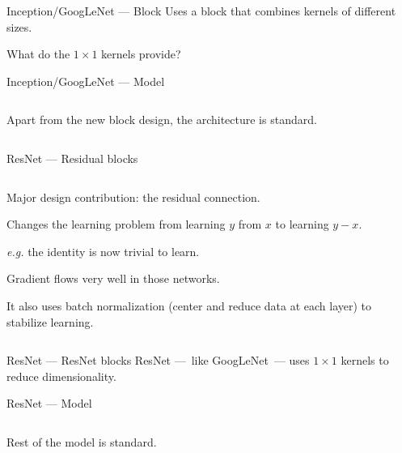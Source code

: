 \begin{frame}{Inception/GoogLeNet --- Block}
  Uses a block that combines kernels of different sizes.


  What do the $1 \times 1$ kernels provide?
\end{frame}

\begin{frame}{Inception/GoogLeNet --- Model}
  \begin{columns}
    \begin{column}{0.6\textwidth}
      Apart from the new block design, the architecture is standard.
    \end{column}
    \begin{column}{0.4\textwidth}
    \end{column}
  \end{columns}
\end{frame}

\begin{frame}{ResNet --- Residual blocks}
  \begin{columns}
    \begin{column}{0.5\textwidth}
      Major design contribution: the residual connection.

      Changes the learning problem from learning $y$ from $x$ to learning $y - x$.

      \emph{e.g.} the identity is now trivial to learn.

      Gradient flows very well in those networks.

      It also uses batch normalization (center and reduce data at each layer) to stabilize learning.
    \end{column}
    \begin{column}{0.5\textwidth}
    \end{column}
  \end{columns}
\end{frame}

\begin{frame}{ResNet --- ResNet blocks}
  ResNet ---~like GoogLeNet~--- uses $1 \times 1$ kernels to reduce dimensionality.

\end{frame}

\begin{frame}{ResNet --- Model}
  \begin{columns}
    \begin{column}{0.5\textwidth}
      Rest of the model is standard.
    \end{column}
    \begin{column}{0.5\textwidth}
    \end{column}
  \end{columns}
\end{frame}


